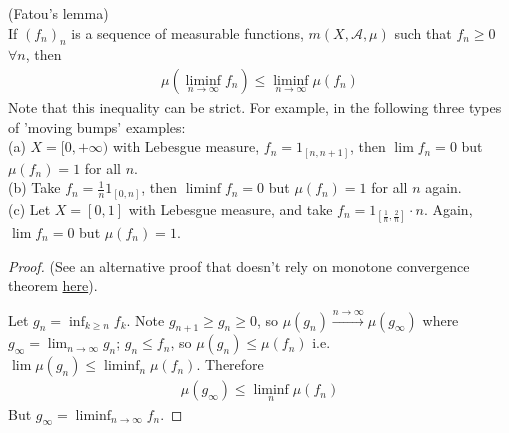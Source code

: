 \documentclass[a4paper]{article}
\begin{document}
\begin{thm} (Fatou's lemma)\\
If $(f_n)_n$ is a sequence of measurable functions, $m(X,\mathcal{A},\mu)$ such that $f_n \geq 0$ $\forall n$, then
\begin{equation*}
\begin{aligned}
\mu (\liminf_{n \to \infty} f_n) \leq \liminf_{n \to \infty} \mu(f_n)
\end{aligned}
\end{equation*}
Note that this inequality can be strict. For example, in the following three types of 'moving bumps' examples:\\
(a) $X = [0,+\infty)$ with Lebesgue measure, $f_n = 1_{[n,n+1]}$, then $\lim f_n =0 $ but $\mu(f_n)=1$ for all $n$.\\
(b) Take $f_n = \frac{1}{n} 1_{[0,n]}$, then $\liminf f_n = 0$ but $\mu(f_n) = 1$ for all $n$ again.\\
(c) Let $X=[0,1]$ with Lebesgue measure, and take $f_n = 1_{[\frac{1}{n},\frac{2}{n}]} \cdot n$. Again, $\lim f_n = 0$ but $\mu(f_n) = 1$.
\begin{proof}
(See an alternative proof that doesn't rely on monotone convergence theorem \href{https://en.wikipedia.org/wiki/Fatou\%27s_lemma#Proof}{here}).

Let $g_n =\inf_{k \geq n} f_k$. Note $g_{n+1} \geq g_n \geq 0$, so $\mu(g_n) \xrightarrow{n \to \infty} \mu(g_\infty)$ where $g_\infty = \lim_{n \to \infty} g_n$; $g_n \leq f_n$, so $\mu(g_n) \leq \mu(f_n)$ i.e. $\lim \mu(g_n) \leq \liminf_n \mu(f_n)$. Therefore
\begin{equation*}
\begin{aligned}
\mu(g_\infty) \leq \liminf_n \mu(f_n)
\end{aligned}
\end{equation*}
But $g_\infty = \liminf_{n \to \infty} f_n$.
\end{proof}
\end{thm}
\end{document}
